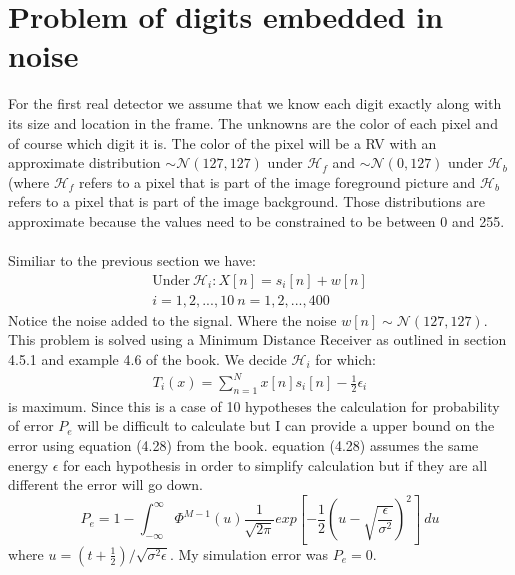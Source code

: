 \documentclass[12pt]{article}
\begin{document}
\section{Problem of digits embedded in noise}
	For the first real detector we assume that we know each digit exactly along with its 			size and location in the frame.
	The unknowns are the color of each pixel and of course which digit it is.
	The color of the pixel will be a RV with an approximate distribution $\sim \mathcal{N}
		(127,127)$ under $\mathcal{H}_f$ and $\sim \mathcal{N}(0,127)$ under
		$\mathcal{H}_b$ (where $\mathcal{H}_f$ refers to a pixel that is part of
		the image foreground picture and $\mathcal{H}_b$ refers to a pixel that is
		part of the image background.
	Those distributions are approximate because the values need to be constrained to be 		between 0 and 255.\\
	\\
	Similiar to the previous section we have:
	\begin{gather*}
		\text{Under} \ \mathcal{H}_i: X[n] = s_i[n] + w[n] \\
		i = 1,2,...,10 \ n=1,2,...,400
	\end{gather*}
	Notice the noise added to the signal. Where the noise $w[n] \sim \mathcal{N}(127,127)$.
	This problem is solved using a Minimum Distance Receiver as outlined in section 4.5.1
		and example 4.6 of the book.
	We decide $\mathcal{H}_i$ for which:
	\begin{gather*}
		T_i(x) = \sum_{n=1}^{N}x[n]s_i[n]-\frac{1}{2}\epsilon_i
	\end{gather*}
	is maximum.
	Since this is a case of 10 hypotheses the calculation for probability of error $P_e$
		will be difficult to calculate but I can provide a upper bound on the error using
		equation (4.28) from the book.
	equation (4.28) assumes the same energy $\epsilon$ for each hypothesis in order to 
		simplify calculation but if they are all different the error will go down.
	\begin{equation}
		P_e = 1-\int_{-\infty}^{\infty}
		\Phi^{M-1}(u)
		\frac{1}{\sqrt{2\pi}}
		exp[-\frac{1}{2}(u-\sqrt{\frac{\epsilon}{\sigma^2}})^2] \ du
	\end{equation}
	where $u = (t+\frac{1}{2})/\sqrt{\sigma^2\epsilon}$.
	My simulation error was $P_e = 0$.
	
\end{document}
